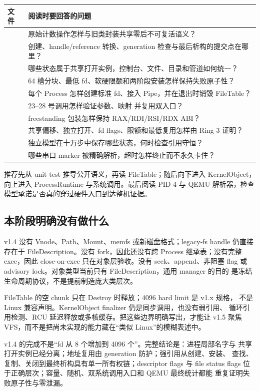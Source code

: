\begin{longtable}{L{0.43\textwidth}L{0.45\textwidth}}
\toprule
文件 & 阅读时要回答的问题\\
\midrule
{} &
原始计数操作怎样与旧类封装共享零后不可复活语义？\\
 &
创建、handle/reference 转换、generation 检查与最后析构的提交点在哪里？\\
 &
哪些状态属于共享打开实例，控制台、文件、目录和管道如何统一？\\
 &
64 槽分块、最低 fd、软硬限额和两阶段安装怎样保持失败原子性？\\
 &
每个 Process 怎样创建标准 fd、接入 Pipe，并在退出时销毁 FileTable？\\
 &
23--28 号调用怎样验证参数、映射  并复用双入口？\\
 &
freestanding 包装怎样保持 RAX/RDI/RSI/RDX ABI？\\
 &
共享偏移、独立打开、fd flags、限额和最低复用怎样由 Ring 3 证明？\\
 &
独立模型在十万步中保存哪些状态，何时检查引用守恒？\\
 &
哪些串口 marker 被精确解析，超时怎样终止而不永久卡住？\\
\bottomrule
\end{longtable}

推荐先从 unit test 推导公开语义，再读 FileTable；随后向下进入
KernelObject，向上进入 ProcessRuntime 与系统调用。最后阅读 PID 4 与 QEMU
解析器，检查模型承诺是否真的穿过硬件入口到达整机证据。

\subsection{本阶段明确没有做什么}

v1.4 没有 Vnode、Path、Mount、memfs 或新磁盘格式；legacy-fs handle 仍直接
存在于 FileDescription。没有 fork，因此还没有跨 Process 继承表；没有完整
exec，因此 close-on-exec 只在对象层验收。没有 seek、append、非阻塞 flag
或 advisory lock。对象类型当前只有 FileDescription，通用 manager 的目的
是冻结生命周期协议，不是提前制造庞大类层次。

FileTable 的空 chunk 只在 Destroy 时释放；4096 hard limit 是 v1.x 规格，
不是 Linux 兼容声明。KernelObject finalizer 仍是同步调用，也没有弱引用、
循环引用检测、RCU 延迟释放或多核缓存。把这些边界明确写出，才能让 v1.5
聚焦 VFS，而不是把尚未实现的能力藏在“类似 Linux”的模糊表述中。

\begin{keyidea}
v1.4 的完成不是“fd 从 8 个增加到 4096 个”。完整结论是：进程局部名字与
共享打开实例已经分离；地址复用由 generation 防护；强引用从创建、安装、
查找、复制、关闭到最终析构具有单一所有权链；descriptor flags 与 file
status flags 位于正确层次；容量、随机、双系统调用入口和 QEMU 最终统计都能
重复证明失败原子性与零泄漏。
\end{keyidea}
